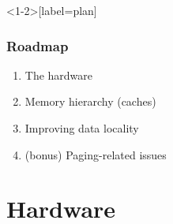 \documentclass[xcolor={x11names,svgnames}]{beamer}
\begin{document}

\begin{frame}<1-2>[label=plan]
  \frametitle{Roadmap}

  \begin{enumerate}
  \item<alert@2> The hardware

    \bigskip
    
  \item Memory hierarchy (caches)

    \bigskip

  \item Improving data locality

    \bigskip

  \item (bonus) Paging-related issues
  \end{enumerate}
  
\end{frame}



\section{Hardware}
\end{document}
